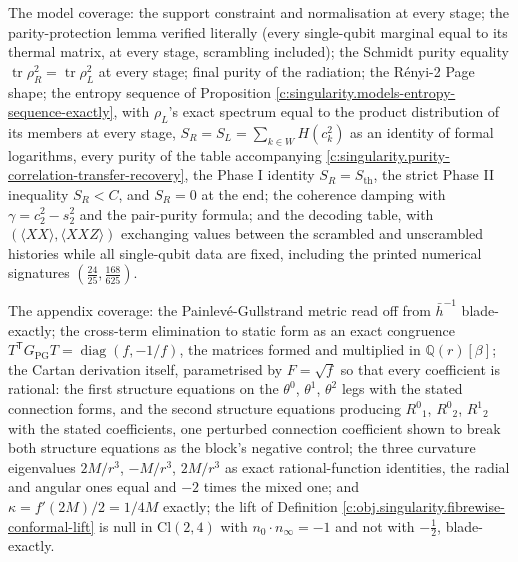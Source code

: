 \documentclass[11pt]{article}
\theoremstyle{definition}
\theoremstyle{plain}
\providecommand{\Cl}{}\renewcommand{\Cl}{\mathrm{Cl}}
\providecommand{\Sth}{}\renewcommand{\Sth}{S_{\mathrm{th}}}
\providecommand{\hb}{}\renewcommand{\hb}{\bar{h}}
\providecommand{\nInf}{}\renewcommand{\nInf}{n_\infty}
\providecommand{\nO}{}\renewcommand{\nO}{n_0}
\providecommand{\tr}{}\renewcommand{\tr}{\operatorname{tr}}
\begin{document}
The model coverage: the support constraint and normalisation at every stage; the parity-protection lemma verified literally (every single-qubit marginal equal to its thermal matrix, at every stage, scrambling included); the Schmidt purity equality $\tr\rho_R^2 = \tr\rho_L^2$ at every stage; final purity of the radiation; the R\'enyi-2 Page shape; the entropy sequence of Proposition \ref{c:singularity.models-entropy-sequence-exactly}, with $\rho_L$'s exact spectrum equal to the product distribution of its members at every stage, $S_R = S_L = \sum_{k \in W}H(c_k^{2})$ as an identity of formal logarithms, every purity of the table accompanying \ref{c:singularity.purity-correlation-transfer-recovery}, the Phase I identity $S_R = \Sth$, the strict Phase II inequality $S_R < C$, and $S_R = 0$ at the end; the coherence damping with $\gamma = c_2^2 - s_2^2$ and the pair-purity formula; and the decoding table, with $(\langle XX\rangle, \langle XXZ\rangle)$ exchanging values between the scrambled and unscrambled histories while all single-qubit data are fixed, including the printed numerical signatures $(\tfrac{24}{25}, \tfrac{168}{625})$.

The appendix coverage: the Painlev\'e-Gullstrand metric read off from $\hb^{-1}$ blade-exactly; the cross-term elimination to static form as an exact congruence $T^{\mathsf T}G_{\mathrm{PG}}T = \operatorname{diag}(f, -1/f)$, the matrices formed and multiplied in $\mathbb{Q}(r)[\beta]$; the Cartan derivation itself, parametrised by $F = \sqrt f$ so that every coefficient is rational: the first structure equations on the $\theta^{0}$, $\theta^{1}$, $\theta^{2}$ legs with the stated connection forms, and the second structure equations producing $R^{0}{}_{1}$, $R^{0}{}_{2}$, $R^{1}{}_{2}$ with the stated coefficients, one perturbed connection coefficient shown to break both structure equations as the block's negative control; the three curvature eigenvalues $2M/r^3$, $-M/r^3$, $2M/r^3$ as exact rational-function identities, the radial and angular ones equal and $-2$ times the mixed one; and $\kappa = f'(2M)/2 = 1/4M$ exactly; the lift of Definition \ref{c:obj.singularity.fibrewise-conformal-lift} is null in $\Cl(2,4)$ with $\nO \cdot \nInf = -1$ and not with $-\tfrac12$, blade-exactly.
\end{document}
